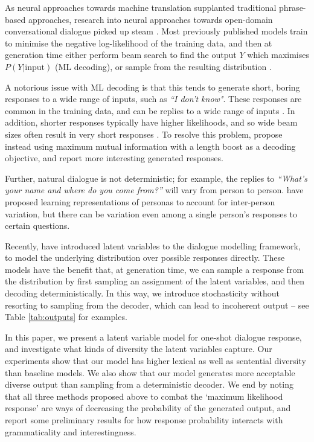 As neural approaches towards machine translation supplanted traditional phrase-based approaches, research into neural approaches towards open-domain conversational dialogue picked up steam \citep{Shang:15,Vinyals:15,Jiwei:16b,Jiwei:16,Serban:16}. Most previously published models train to minimise the negative log-likelihood of the training data, and then at generation time either perform beam search to find the output $Y$ which maximises $P(Y|\mathrm{input})$ \citep{Shang:15,Vinyals:15,Serban:16} (ML decoding), or sample from the resulting distribution \citep{Serban:16}. 

A notorious issue with ML decoding is that this tends to generate short, boring responses to a wide range of inputs, such as \textit{``I don't know"}. These responses are common in the training data, and can be replies to a wide range of inputs \citep{Jiwei:16,Serban:16}. In addition, shorter responses typically have higher likelihoods, and so wide beam sizes often result in very short responses \citep{Tu:2017,Belz:2007}. To resolve this problem, \citet{Jiwei:16} propose instead using maximum mutual information with a length boost as a decoding objective, and report more interesting generated responses.

Further, natural dialogue is not deterministic; for example, the replies to \textit{``What's your name and where do you come from?''} will vary from person to person. \citet{Jiwei:16b} have proposed learning representations of personas to account for inter-person variation, but there can be variation even among a single person's responses to certain questions.

Recently, \citet{Serban:17} have introduced latent variables to the dialogue modelling framework, to model the underlying distribution over possible responses directly. These models have the benefit that, at generation time, we can sample a response from the distribution by first sampling an assignment of the latent variables, and then decoding deterministically. In this way, we introduce stochasticity without resorting to sampling from the decoder, which can lead to incoherent output -- see Table \ref{tab:outputs} for examples.

In this paper, we present a latent variable model for one-shot dialogue response, and investigate what kinds of diversity the latent variables capture. Our experiments show that our model has higher lexical as well as sentential diversity than baseline models. We also show that our model generates more acceptable diverse output than sampling from a deterministic decoder. We end by noting that all three methods proposed above to combat the `maximum likelihood response' are ways of decreasing the probability of the generated output, and report some preliminary results for how response probability interacts with grammaticality and interestingness.

